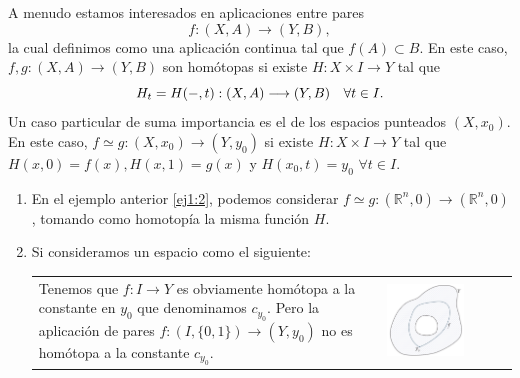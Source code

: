 A menudo estamos interesados en aplicaciones entre pares
\[f : (X, A) \longrightarrow (Y, B), \]
la cual definimos como una aplicación continua tal que $f(A) \subset B$. En este caso, $f, g : (X, A) \longrightarrow (Y, B)$ son homótopas si existe $H : X \times I \longrightarrow Y$ tal que 
\[
H_t = \nobreak H(-, t) : (X, A) \longrightarrow (Y, B) \quad \forall t \in I.
\]
Un caso particular de suma importancia es el de los espacios punteados $(X, x_0)$. En este caso, $f \simeq g : (X, x_0) \longrightarrow (Y, y_0)$ si existe $H: X \times I \longrightarrow Y$ tal que $H(x, 0) = f(x), H(x, 1) = g(x)$ y $H(x_0, t) = y_0$ $\forall t \in I$.\\
\begin{ejems}
\begin{enumerate}
\item \label{ej2:1} En el ejemplo anterior \ref{ej1:2}, podemos considerar $f \simeq g : (\mathbb{R}^n, 0) \longrightarrow (\mathbb{R}^n, 0)$, tomando como homotopía la misma función $H$.

\item \label{ej2:2} Si consideramos un espacio como el siguiente: \\
\begin{tabular}{ll}
\begin{minipage}{0.5\textwidth}
Tenemos que $f : I \longrightarrow Y$ es obviamente homótopa a la constante en $y_0$ que denominamos $c_{y_0}$. Pero la aplicación de pares $f : (I, \{ 0,1 \}) \longrightarrow (Y, y_0)$ no es homótopa a la constante $c_{y_0}$.
\end{minipage}
&
\begin{minipage}{0.5\textwidth}
\includegraphics[width=0.65\textwidth]{images/homotrelatalt.pdf}
\end{minipage}
\end{tabular}


\end{enumerate}
\end{ejems}
